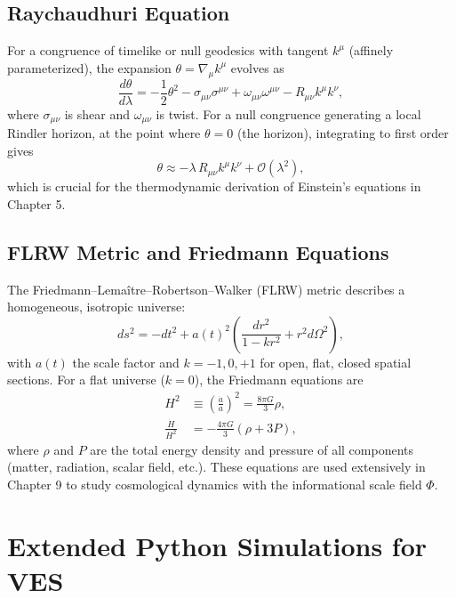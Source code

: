 \documentclass[12pt,a4paper]{book}
\begin{document}
\section{Raychaudhuri Equation}

For a congruence of timelike or null geodesics with tangent $k^\mu$ (affinely parameterized), the expansion $\theta = \nabla_\mu k^\mu$ evolves as
\begin{equation}
    \frac{d\theta}{d\lambda} = -\frac12 \theta^2 - \sigma_{\mu\nu} \sigma^{\mu\nu} + \omega_{\mu\nu} \omega^{\mu\nu} - R_{\mu\nu} k^\mu k^\nu,
\end{equation}
where $\sigma_{\mu\nu}$ is shear and $\omega_{\mu\nu}$ is twist. For a null congruence generating a local Rindler horizon, at the point where $\theta=0$ (the horizon), integrating to first order gives
\begin{equation}
    \theta \approx -\lambda \, R_{\mu\nu} k^\mu k^\nu + \mathcal{O}(\lambda^2),
\end{equation}
which is crucial for the thermodynamic derivation of Einstein's equations in Chapter 5.

\section{FLRW Metric and Friedmann Equations}

The Friedmann–Lemaître–Robertson–Walker (FLRW) metric describes a homogeneous, isotropic universe:
\begin{equation}
    ds^2 = -dt^2 + a(t)^2 \left( \frac{dr^2}{1-k r^2} + r^2 d\Omega^2 \right),
\end{equation}
with $a(t)$ the scale factor and $k = -1,0,+1$ for open, flat, closed spatial sections. For a flat universe ($k=0$), the Friedmann equations are
\begin{align}
    H^2 &\equiv \left( \frac{\dot a}{a} \right)^2 = \frac{8\pi G}{3} \rho, \\
    \frac{\dot{H}}{H^2} &= -\frac{4\pi G}{3} (\rho + 3P),
\end{align}
where $\rho$ and $P$ are the total energy density and pressure of all components (matter, radiation, scalar field, etc.). These equations are used extensively in Chapter 9 to study cosmological dynamics with the informational scale field $\Phi$.

\chapter{Extended Python Simulations for VES}
\end{document}
